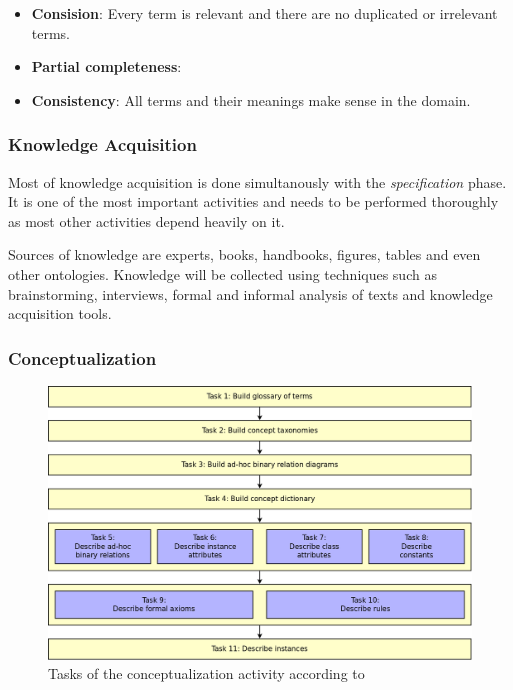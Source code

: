 \begin{itemize}
  \item \textbf{Consision}: Every term is relevant and there are no duplicated or irrelevant terms.
  \item \textbf{Partial completeness}: %
  \item \textbf{Consistency}: All terms and their meanings make sense in the domain.
\end{itemize}

\subsubsection{Knowledge Acquisition}

Most of knowledge acquisition is done simultanously with the \emph{specification} phase. It is one of the most important activities and needs to be performed thoroughly as most other activities depend heavily on it.

Sources of knowledge are experts, books, handbooks, figures, tables and even other ontologies. Knowledge will be collected using techniques such as brainstorming, interviews, formal and informal analysis of texts and knowledge acquisition tools.

\subsubsection{Conceptualization}

\begin{figure}
  \includegraphics[width=\textwidth]{figures/methontology_tasks.png}
  \caption{Tasks of the conceptualization activity according to \methontology \cite{MethontologyLegal}}
  \label{fig:methontology2}
\end{figure}

